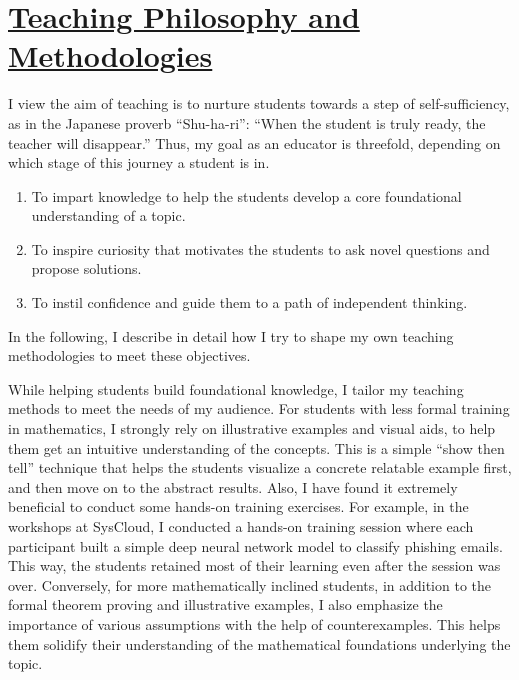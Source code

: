\documentclass[a4paper,10pt]{article}
\begin{document}
\section*{\underline{Teaching Philosophy and Methodologies}}

I view the aim of teaching is to nurture students towards a step of self-sufficiency, as in the Japanese proverb “Shu-ha-ri”: “When the student is truly ready, the teacher will disappear.” Thus, my goal as an educator is threefold, depending on which stage of this journey a student is in.
\begin{enumerate}[noitemsep]
    \item To impart knowledge to help the students develop a core foundational understanding of a topic.
    \item To inspire curiosity that motivates the students to ask novel questions and propose solutions.
    \item To instil confidence and guide them to a path of independent thinking.
\end{enumerate}
\noindent In the following, I describe in detail how I try to shape my own teaching methodologies to meet these objectives.

While helping students build foundational knowledge, I tailor my teaching methods to meet the needs of my audience. For students with less formal training in mathematics, I strongly rely on illustrative examples and visual aids, to help them get an intuitive understanding of the concepts. This is a simple “show then tell” technique that helps the students visualize a concrete relatable example first, and then move on to the abstract results. Also, I have found it extremely beneficial to conduct some hands-on training exercises. For example, in the workshops at SysCloud, I conducted a hands-on training session where each participant built a simple deep neural network model to classify phishing emails. This way, the students retained most of their learning even after the session was over. Conversely, for more mathematically inclined students, in addition to the formal theorem proving and illustrative examples, I also emphasize the importance of various assumptions with the help of counterexamples. This helps them solidify their understanding of the mathematical foundations underlying the topic.
\end{document}
